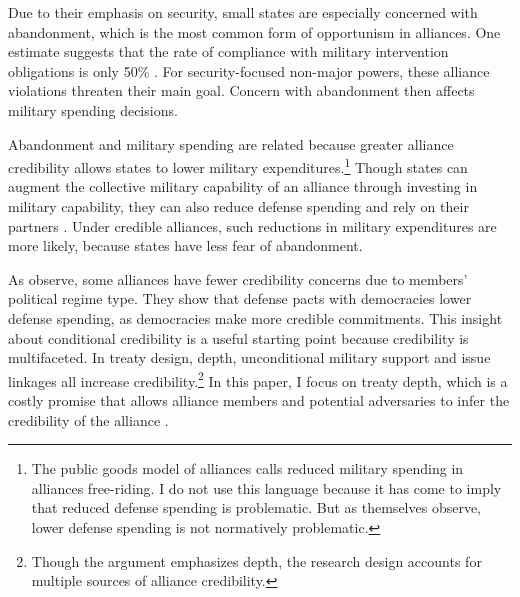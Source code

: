 \documentclass[12pt]{article}
\begin{document}
Due to their emphasis on security, small states are especially concerned with abandonment, which is the most common form of opportunism in alliances.
One estimate suggests that the rate of compliance with military intervention obligations is only 50\% \citep{BerkemeierFuhrmann2018}.
For security-focused non-major powers, these alliance violations threaten their main goal. 
Concern with abandonment then affects military spending decisions. 


Abandonment and military spending are related because greater alliance credibility allows states to lower military expenditures.\footnote{The public goods model of alliances calls reduced military spending in alliances free-riding. I do not use this language because it has come to imply that reduced defense spending is problematic. But as \citet[pg. 278]{OlsonZeckhauser1966} themselves observe, lower defense spending is not normatively problematic.}
Though states can augment the collective military capability of an alliance through investing in military capability, they can also reduce defense spending and rely on their partners \citep{OlsonZeckhauser1966, Morrow1993, Conybeare1994, SandlerHartley2001}.
Under credible alliances, such reductions in military expenditures are more likely, because states have less fear of abandonment. 


As \citet{DigiuseppePoast2016} observe, some alliances have fewer credibility concerns due to members' political regime type.
They show that defense pacts with democracies lower defense spending, as democracies make more credible commitments.
This insight about conditional credibility is a useful starting point because credibility is multifaceted. 
In treaty design, depth, unconditional military support \citep{Benson2012, Chibaetal2015} and issue linkages \citep{LongLeeds2006, Poast2012, Poast2013} all increase credibility.\footnote{Though the argument emphasizes depth, the research design accounts for multiple sources of alliance credibility.}
In this paper, I focus on treaty depth, which is a costly promise that allows alliance members and potential adversaries to infer the credibility of the alliance \citep{Leeds2003, FuhrmannSechser2014}. 
\end{document}
